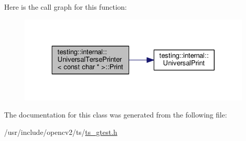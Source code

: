 Here is the call graph for this function\-:\nopagebreak
\begin{figure}[H]
\begin{center}
\leavevmode
\includegraphics[width=320pt]{classtesting_1_1internal_1_1UniversalTersePrinter_3_01const_01char_01_5_01_4_aa7bc28677539f2f151e8fbcd9c573655_cgraph}
\end{center}
\end{figure}




The documentation for this class was generated from the following file\-:\begin{DoxyCompactItemize}
\item 
/usr/include/opencv2/ts/\hyperlink{ts__gtest_8h}{ts\-\_\-gtest.\-h}\end{DoxyCompactItemize}
